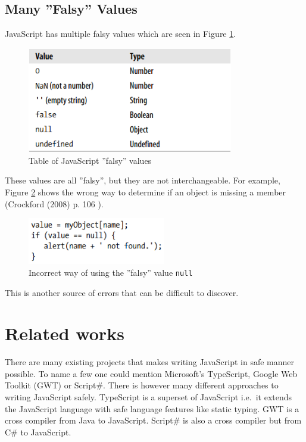 	\subsection{Many ''Falsy'' Values} %
	\label{sub:many_falsy_values}
		JavaScript has multiple falsy values which are seen in Figure \ref{falsyValues}.

			\begin{figure}[H]
				\begin{center}
					\centerline{\includegraphics[width=9cm]{resources/images/FalsyValues.png}}
				\end{center}
				\caption{Table of JavaScript ''falsy'' values \cite{good_parts}}
				\label{falsyValues}
			\end{figure}

		These values are all ''falsy'', but they are not interchangeable. For example, Figure \ref{falsyExample} shows the wrong way to determine if an object is missing a member (Crockford (2008) p. 106 \cite{good_parts}).

					\begin{figure}[H]
				\begin{center}
					\centerline{\includegraphics[width=6cm]{resources/images/FalsyExample.png}}
				\end{center}
				\caption{Incorrect way of using the ''falsy'' value \texttt{null} \cite{good_parts}}
				\label{falsyExample}
			\end{figure}

		This is another source of errors that can be difficult to discover.

\section{Related works} %
\label{sec:related_works}
	There are many existing projects that makes writing JavaScript in safe manner possible. To name a few one could mention Microsoft’s TypeScript, Google Web Toolkit (GWT) or Script\#. There is however many different approaches to writing JavaScript safely. TypeScript is a superset of JavaScript i.e.\ it extends the JavaScript language with safe language features like static typing. GWT is a cross compiler from Java to JavaScript. Script\# is also a cross compiler but from C\# to JavaScript.

